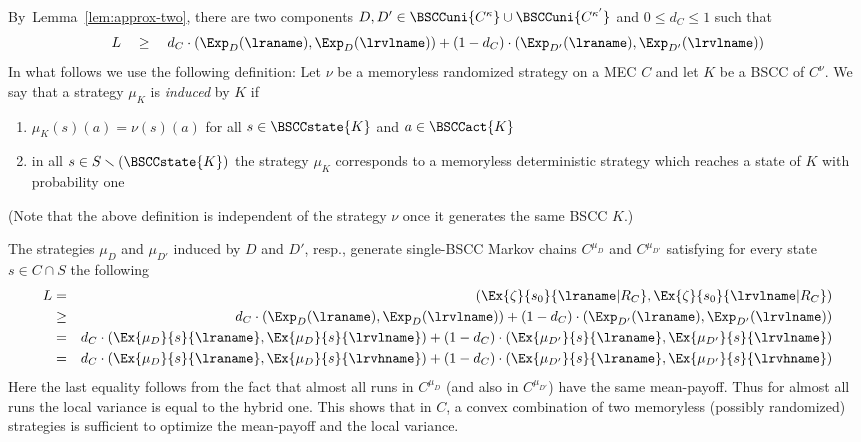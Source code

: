 By~Lemma~\ref{lem:approx-two}, there are two components $D,D'\in \BSCCuni{C^{\kappa}}\cup \BSCCuni{C^{\kappa'}}$ and $0\leq d_C\leq 1 $ such that
\[
L  \quad \geq \quad d_C \cdot \left(\Exp_D(\lraname),\Exp_D(\lrvlname)\right) 
 + (1-d_C)\cdot \left(\Exp_{D'}(\lraname),\Exp_{D'}(\lrvlname)\right) 
\]
In what follows we use the following definition: Let $\nu$ be a memoryless randomized strategy on a MEC $C$ and let $K$ be a BSCC of $C^{\nu}$. We say that a strategy $\mu_K$ is {\em induced} by $K$ if 
\begin{enumerate}
\item $\mu_K(s)(a)=\nu(s)(a)$ for all $s\in \BSCCstate{K}$ and $a\in \BSCCact{K}$
\item in all $s\in S\smallsetminus (\BSCCstate{K})$ the strategy $\mu_K$ corresponds to a memoryless deterministic strategy which reaches a state of $K$ with probability one
\end{enumerate}
(Note that the above definition is independent of the strategy $\nu$ once it generates the same BSCC $K$.)

The strategies $\mu_D$ and $\mu_{D'}$ induced by $D$ and $D'$, resp., generate single-BSCC Markov chains $C^{\mu_D}$ and $C^{\mu_{D'}}$ satisfying for every state $s\in C\cap S$ the following
\begin{eqnarray*}
L &= & (\Ex{\zeta}{s_0}{\lraname|R_C}, \Ex{\zeta}{s_0}{\lrvlname|R_C}) \\
  &\geq & d_C \cdot \left(\Exp_D(\lraname),\Exp_D(\lrvlname)\right) 
 + (1-d_C)\cdot \left(\Exp_{D'}(\lraname),\Exp_{D'}(\lrvlname)\right) \\
  & = & d_C\cdot (\Ex{\mu_D}{s}{\lraname}, \Ex{\mu_D}{s}{\lrvlname}) + (1-d_C)\cdot (\Ex{\mu_{D'}}{s}{\lraname}, \Ex{\mu_{D'}}{s}{\lrvlname}) \\
  & = &  d_C\cdot (\Ex{\mu_D}{s}{\lraname}, \Ex{\mu_D}{s}{\lrvhname}) + (1-d_C)\cdot (\Ex{\mu_{D'}}{s}{\lraname}, \Ex{\mu_{D'}}{s}{\lrvhname}) 
\end{eqnarray*}
Here the last equality follows from the fact that almost all runs in $C^{\mu_{D}}$ (and also in $C^{\mu_{D'}}$) have the same mean-payoff. Thus for almost all runs the local variance is equal to the hybrid one. This shows that in $C$, a convex combination of two memoryless (possibly randomized) strategies is sufficient to optimize the mean-payoff and the local variance. 

